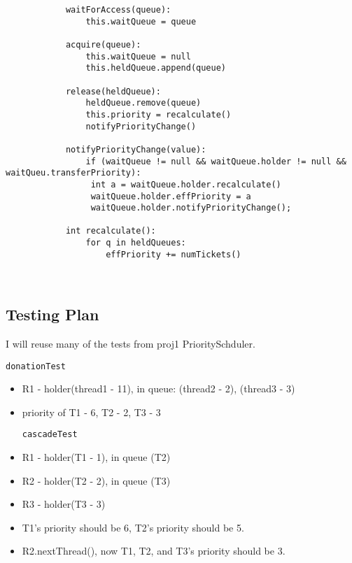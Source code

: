 \begin{verbatim}
            waitForAccess(queue):
                this.waitQueue = queue
            
            acquire(queue):                                     
                this.waitQueue = null
                this.heldQueue.append(queue)
            
            release(heldQueue):                      
                heldQueue.remove(queue)
                this.priority = recalculate()
                notifyPriorityChange()
                
            notifyPriorityChange(value):
                if (waitQueue != null && waitQueue.holder != null && waitQueu.transferPriority):
            	 int a = waitQueue.holder.recalculate()
            	 waitQueue.holder.effPriority = a
            	 waitQueue.holder.notifyPriorityChange();
            
            int recalculate():
                for q in heldQueues:
                    effPriority += numTickets()
             
            
\end{verbatim}
\subsection{Testing Plan}
I will reuse many of the tests from proj1 PrioritySchduler.

\texttt{donationTest}
\begin{itemize}
\item R1 - holder(thread1 - 11), in queue: (thread2 - 2), (thread3 - 3)
\item priority of T1 - 6, T2 - 2, T3 - 3

\texttt{cascadeTest}
\item R1 - holder(T1 - 1), in queue (T2)
\item R2 - holder(T2 - 2), in queue (T3)
\item R3 - holder(T3 - 3)
\item T1's priority should be 6, T2's priority should be 5.
\item R2.nextThread(), now T1, T2, and T3's priority should be 3.
\end{itemize}
